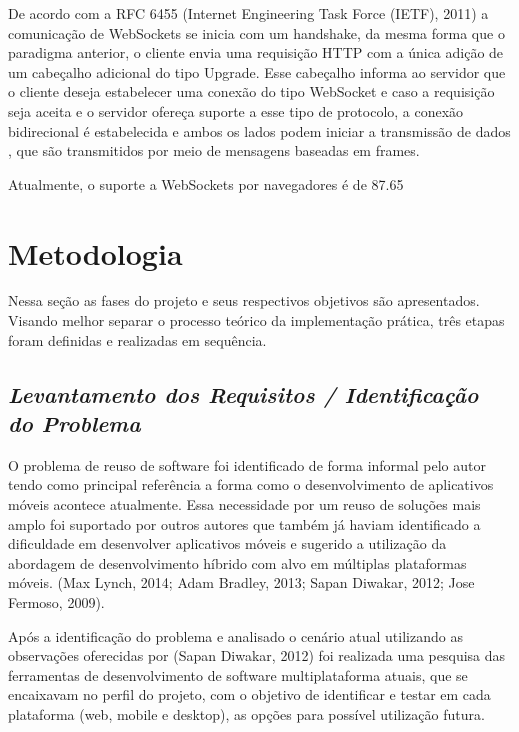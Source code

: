 De acordo com a RFC 6455 (Internet Engineering Task Force (IETF), 2011) a comunicação de WebSockets se inicia com um handshake, da mesma forma que o paradigma anterior, o cliente envia uma requisição HTTP com a única adição de um cabeçalho adicional do tipo Upgrade. Esse cabeçalho informa ao servidor que o cliente deseja estabelecer uma conexão do tipo WebSocket e caso a requisição seja aceita e o servidor ofereça suporte a esse tipo de protocolo, a conexão bidirecional é estabelecida e ambos os lados podem iniciar a transmissão de dados , que são transmitidos por meio de mensagens baseadas em frames.

Atualmente, o suporte a WebSockets por navegadores é de 87.65%

\section{\esp Metodologia}
Nessa seção as fases do projeto e seus respectivos objetivos são apresentados. Visando melhor separar o processo teórico da implementação prática, três etapas foram definidas e realizadas em sequência.

\subsection{{\it Levantamento dos Requisitos / Identificação do Problema}}
O problema de reuso de software foi identificado de forma informal pelo autor tendo como principal referência a forma como o desenvolvimento de aplicativos móveis acontece atualmente. Essa necessidade por um reuso de soluções mais amplo foi suportado por outros autores que também já haviam identificado a dificuldade em desenvolver aplicativos móveis e sugerido a utilização da abordagem de desenvolvimento híbrido com alvo em múltiplas plataformas móveis. (Max Lynch, 2014; Adam Bradley, 2013; Sapan Diwakar, 2012; Jose Fermoso, 2009). 

Após a identificação do problema e analisado o cenário atual utilizando as observações oferecidas por (Sapan Diwakar, 2012) foi realizada uma pesquisa das ferramentas de desenvolvimento de software multiplataforma atuais, que se encaixavam no perfil do projeto, com o objetivo de identificar e testar em cada plataforma (web, mobile e desktop), as opções para possível utilização futura. 

